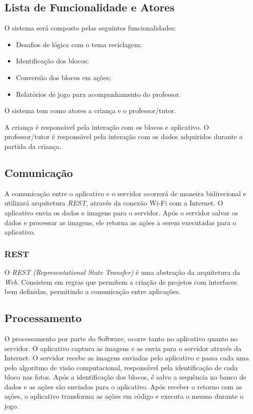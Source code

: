     \subsection{Lista de Funcionalidade e Atores}
    O sistema será composto  pelas seguintes funcionalidades:
    \begin{itemize}
        \item Desafios de lógica com o tema reciclagem;
        \item Identificação dos blocos;
        \item Conversão dos blocos em ações;
        \item Relatórios de jogo para acompanhamento do professor.
    \end{itemize}
    
    O sistema tem como atores a criança e o professor/tutor.
    
    A criança é responsável pela interação com os blocos e aplicativo.
    O professor/tutor é responsável pela interação com os dados adquiridos durante a partida da criança.
    
    \subsection{Comunicação}
    A comunicação entre o aplicativo e o servidor ocorrerá de maneira bidirecional e utilizará arquitetura \textit{REST}, através da conexão Wi-Fi com a Internet.
    O aplicativo envia os dados e imagens para o servidor. Após o servidor salvar os dados e processar as imagens, ele retorna as ações a serem executadas para o aplicativo.
    
        \subsubsection{REST}
        O \textit{REST (Representational State Transfer)} é uma abstração da arquitetura da \textit{Web}. Consistem em regras que permitem a criação de projetos com interfaces bem definidas, permitindo a comunicação entre aplicações.
    
    \subsection{Processamento}
    O processamento por parte do Software, ocorre tanto no aplicativo quanto no servidor.
    O aplicativo captura as imagens e as envia para o servidor através da Internet.
    O servidor recebe as imagens enviadas pelo aplicativo e passa cada uma pelo algoritmo de visão computacional, responsável pela identificação de cada bloco nas fotos. Após a identificação dos blocos, é salvo a sequência no banco de dados e as ações são enviadas para o aplicativo.
    Após receber o retorno com as ações, o aplicativo transforma as ações em código e executa o mesmo durante o jogo.
    
